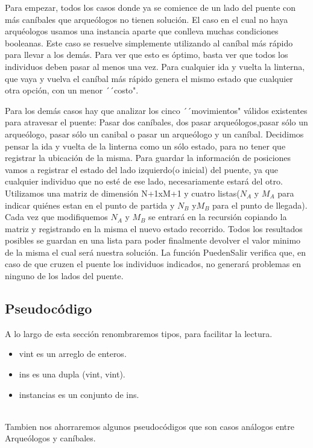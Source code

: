 \documentclass[spanish,12pt]{article}
\begin{document}
Para empezar, todos los casos donde ya se comience de un lado del puente con más caníbales que arqueólogos no tienen solución.
El caso en el cual no haya arquéologos usamos una instancia aparte que conlleva muchas condiciones booleanas. Este caso se resuelve simplemente utilizando al caníbal más rápido para llevar a los demás. Para ver que esto es óptimo, basta ver que todos los individuos deben pasar al menos una vez. Para cualquier ida y vuelta la linterna, que vaya y vuelva el caníbal más rápido genera el mismo estado que cualquier otra opción, con un menor ´´costo".


Para los demás casos hay que analizar los cinco ´´movimientos"  válidos existentes para atravesar el puente: Pasar dos caníbales, dos pasar arqueólogos,pasar sólo un arqueólogo, pasar sólo un canibal o pasar un arqueólogo y un caníbal.
Decidimos pensar la ida y vuelta de la linterna como un sólo estado, para no tener que registrar la ubicación de la misma.
Para guardar la información de posiciones vamos a registrar el estado del lado izquierdo(o inicial) del puente, ya que cualquier individuo que no esté de ese lado, necesariamente estará del otro. Utilizamos una matriz de dimensión N+1xM+1 y cuatro listas($N_A$ y $M_A$ para indicar quiénes estan en el punto de partida y $N_B$ y$ M_B$ para el punto de llegada). Cada vez que modifiquemos $N_A$ y $M_B$ se entrará en la recursión copiando la matriz y registrando en la misma el nuevo estado recorrido.
Todos los resultados posibles se guardan en una lista para poder finalmente devolver el valor minimo de la misma el cual será nuestra solución.
La función PuedenSalir verifica que, en caso de que cruzen el puente los individuos indicados, no generará problemas en ninguno de los lados del puente.



\subsection{Pseudocódigo}

A lo largo de esta sección renombraremos tipos, para facilitar la lectura.
\begin{itemize}
	\item vint es un arreglo de enteros.
	\item ins es una dupla (vint, vint).
	\item instancias es un conjunto de ins.
\end{itemize}
\\
Tambien nos ahorraremos algunos pseudocódigos que son casos análogos entre Arqueólogos y caníbales.
\end{document}
